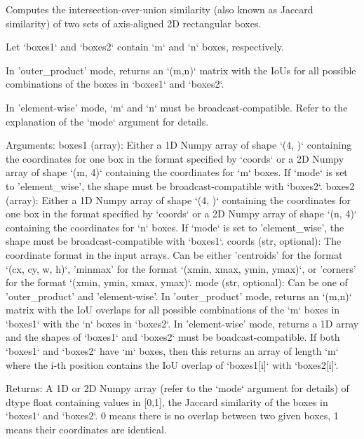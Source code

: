 \begin{DoxyVerb}Computes the intersection-over-union similarity (also known as Jaccard similarity)
of two sets of axis-aligned 2D rectangular boxes.

Let `boxes1` and `boxes2` contain `m` and `n` boxes, respectively.

In 'outer_product' mode, returns an `(m,n)` matrix with the IoUs for all possible
combinations of the boxes in `boxes1` and `boxes2`.

In 'element-wise' mode, `m` and `n` must be broadcast-compatible. Refer to the explanation
of the `mode` argument for details.

Arguments:
    boxes1 (array): Either a 1D Numpy array of shape `(4, )` containing the coordinates for one box in the
        format specified by `coords` or a 2D Numpy array of shape `(m, 4)` containing the coordinates for `m` boxes.
        If `mode` is set to 'element_wise', the shape must be broadcast-compatible with `boxes2`.
    boxes2 (array): Either a 1D Numpy array of shape `(4, )` containing the coordinates for one box in the
        format specified by `coords` or a 2D Numpy array of shape `(n, 4)` containing the coordinates for `n` boxes.
        If `mode` is set to 'element_wise', the shape must be broadcast-compatible with `boxes1`.
    coords (str, optional): The coordinate format in the input arrays. Can be either 'centroids' for the format
        `(cx, cy, w, h)`, 'minmax' for the format `(xmin, xmax, ymin, ymax)`, or 'corners' for the format
        `(xmin, ymin, xmax, ymax)`.
    mode (str, optional): Can be one of 'outer_product' and 'element-wise'. In 'outer_product' mode, returns an
        `(m,n)` matrix with the IoU overlaps for all possible combinations of the `m` boxes in `boxes1` with the
        `n` boxes in `boxes2`. In 'element-wise' mode, returns a 1D array and the shapes of `boxes1` and `boxes2`
        must be boadcast-compatible. If both `boxes1` and `boxes2` have `m` boxes, then this returns an array of
        length `m` where the i-th position contains the IoU overlap of `boxes1[i]` with `boxes2[i]`.

Returns:
    A 1D or 2D Numpy array (refer to the `mode` argument for details) of dtype float containing values in [0,1],
    the Jaccard similarity of the boxes in `boxes1` and `boxes2`. 0 means there is no overlap between two given
    boxes, 1 means their coordinates are identical.
\end{DoxyVerb}
 